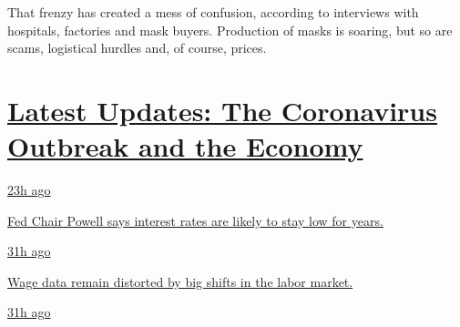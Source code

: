 That frenzy has created a mess of confusion, according to interviews
with hospitals, factories and mask buyers. Production of masks is
soaring, but so are scams, logistical hurdles and, of course, prices.

\hypertarget{latest-updates-the-coronavirus-outbreak-and-the-economy}{%
\section{\texorpdfstring{\href{https://www.nytimes3xbfgragh.onion/live/2020/09/04/business/stock-market-today-coronavirus?action=click\&pgtype=Article\&state=default\&region=MAIN_CONTENT_1\&context=storylines_live_updates}{Latest
Updates: The Coronavirus Outbreak and the
Economy}}{Latest Updates: The Coronavirus Outbreak and the Economy}}\label{latest-updates-the-coronavirus-outbreak-and-the-economy}}

\href{https://www.nytimes3xbfgragh.onion/live/2020/09/04/business/stock-market-today-coronavirus?action=click\&pgtype=Article\&state=default\&region=MAIN_CONTENT_1\&context=storylines_live_updates\#fed-chair-powell-says-interest-rates-are-likely-to-stay-low-for-years}{23h
ago}

\href{https://www.nytimes3xbfgragh.onion/live/2020/09/04/business/stock-market-today-coronavirus?action=click\&pgtype=Article\&state=default\&region=MAIN_CONTENT_1\&context=storylines_live_updates\#fed-chair-powell-says-interest-rates-are-likely-to-stay-low-for-years}{Fed
Chair Powell says interest rates are likely to stay low for years.}

\href{https://www.nytimes3xbfgragh.onion/live/2020/09/04/business/stock-market-today-coronavirus?action=click\&pgtype=Article\&state=default\&region=MAIN_CONTENT_1\&context=storylines_live_updates\#wage-data-remain-distorted-by-big-shifts-in-the-labor-market}{31h
ago}

\href{https://www.nytimes3xbfgragh.onion/live/2020/09/04/business/stock-market-today-coronavirus?action=click\&pgtype=Article\&state=default\&region=MAIN_CONTENT_1\&context=storylines_live_updates\#wage-data-remain-distorted-by-big-shifts-in-the-labor-market}{Wage
data remain distorted by big shifts in the labor market.}

\href{https://www.nytimes3xbfgragh.onion/live/2020/09/04/business/stock-market-today-coronavirus?action=click\&pgtype=Article\&state=default\&region=MAIN_CONTENT_1\&context=storylines_live_updates\#after-taking-the-heaviest-employment-hit-women-make-a-sharp-rebound}{31h
ago}

